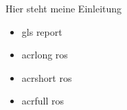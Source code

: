 Hier steht meine Einleitung \cite{template.2021}

\begin{itemize}
	\item gls \gls{report}
	\item acrlong \acrlong{ros}
	\item acrshort \acrshort{ros}
	\item acrfull \acrfull{ros}
\end{itemize}